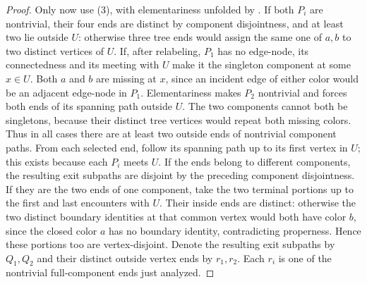 \begin{proof}
Only now use (3), with elementariness unfolded by
.  If both $P_i$ are nontrivial,
their four ends are distinct by component disjointness, and at least two
lie outside $U$: otherwise three tree ends would assign the same one of
$a,b$ to two distinct vertices of $U$.  If, after relabeling, $P_1$ has
no edge-node, its connectedness and its meeting with $U$ make it the
singleton component at some $x\in U$.  Both $a$ and $b$ are missing at
$x$, since an incident edge of either color would be an adjacent edge-node
in $P_1$.  Elementariness makes $P_2$ nontrivial and forces both ends of
its spanning path outside $U$.  The two components cannot both be
singletons, because their distinct tree vertices would repeat both
missing colors.  Thus in all cases there are at least two outside ends of
nontrivial component paths.  From each selected end, follow its spanning
path up to its first vertex in $U$; this exists because each $P_i$ meets
$U$.  If the ends belong to different components, the resulting exit
subpaths are disjoint by the preceding component disjointness.  If they
are the two ends of one component, take the two terminal portions up to
the first and last encounters with $U$.  Their inside ends are distinct:
otherwise the two distinct boundary identities at that common vertex
would both have color $b$, since the closed color $a$ has no boundary
identity, contradicting properness.  Hence these portions too are
vertex-disjoint.  Denote the resulting exit subpaths by $Q_1,Q_2$ and
their distinct outside vertex ends by $r_1,r_2$.  Each $r_i$ is one of the
nontrivial full-component ends just analyzed.


\end{proof}
